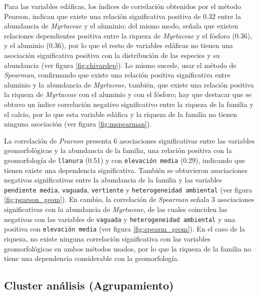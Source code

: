 \documentclass[11pt,]{article}
\begin{document}
Para las variables edáficas, los índices de correlación obtenidos por el
método Pearson, indican que existe una relación significativa positiva
de 0.32 entre la abundancia de \emph{Myrtaceae} y el aluminio; del mismo
modo, señala que existen relaciones dependientes positiva entre la
riqueza de \emph{Myrtaceae} y el fósforo (0.36), y el aluminio (0.36),
por lo que el resto de variables edáficas no tienen una asociación
significativa positiva con la distribución de las especies y su
abundancia (ver figura \ref{fig:chivardep}). Lo mismo sucede, usar el
método de \emph{Spearman}, confirmando que existe una relación positiva
significativa entre aluminio y la abundancia de \emph{Myrtaceae},
también, que existe una relación positiva la riqueza de \emph{Myrtaceae}
con el aluminio y con el fósforo; hay que destacar que se obtuvo un
índice correlación negativo significativo entre la riqueza de la familia
y el calcio, por lo que esta variable edáfica y la riqueza de la familia
no tienen ninguna asociación (ver figura \ref{fig:mspearman}).

La correlación de \emph{Pearson} presenta 6 asociaciones significativas
entre las variables geomorfológicas y la abundancia de la familia, una
relación positiva con la geomorfología de \texttt{llanura} (0.51) y con
\texttt{elevación\ media} (0.29), indicando que tienen existe una
dependencia significativa. También se obtuvieron asociaciones negativas
significativas entre la abundancia de la familia y las variables
\texttt{pendiente\ media}, \texttt{vaguada}, \texttt{vertiente} y
\texttt{heterogeneidad\ ambiental} (ver figura \ref{fig:pearson_geom}).
En cambio, la correlación de \emph{Spearman} señala 3 asociaciones
significativas con la abundancia de \emph{Myrtaceae}, de las cuales
coinciden las negativas con las variables de \texttt{vaguada} y
\texttt{heterogeneidad\ ambiental} y una positiva con
\texttt{elevación\ media} (ver figura \ref{fig:spearm_geom}). En el caso
de la riqueza, no existe ninguna correlación significativa con las
variables geomorfológicas en ambos métodos usados, por lo que la riqueza
de la familia no tiene una dependencia considerable con la
geomorfología.

\subsection{Cluster análisis
(Agrupamiento)}\label{cluster-anuxe1lisis-agrupamiento}
\end{document}

